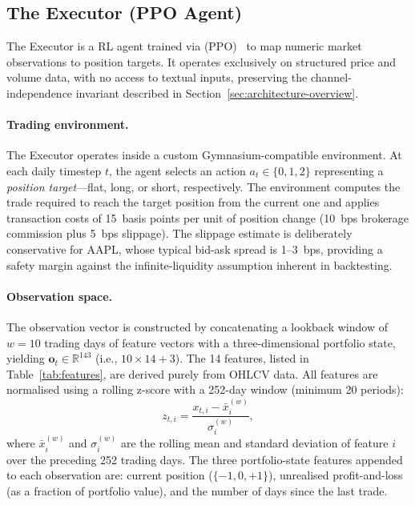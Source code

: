 \subsection{The Executor (PPO Agent)}
\label{sec:executor}

The Executor is a RL agent trained via (PPO)~\cite{schulman2017proximalpolicyoptimizationalgorithms}
to map numeric market observations to position targets. It operates
exclusively on structured price and volume data, with no access to textual
inputs, preserving the channel-independence invariant described in
Section~\ref{sec:architecture-overview}.

\paragraph{Trading environment.}
The Executor operates inside a custom Gymnasium-compatible environment. At
each daily timestep $t$, the agent selects an action
$a_t \in \{0, 1, 2\}$ representing a \emph{position target}---flat, long,
or short, respectively. The environment computes the trade required to reach
the target position from the current one and applies transaction costs of
15~basis points per unit of position change (10~bps brokerage commission plus
5~bps slippage). The slippage estimate is deliberately conservative for
AAPL, whose typical bid-ask spread is 1--3~bps, providing a safety margin
against the infinite-liquidity assumption inherent in backtesting.

\paragraph{Observation space.}
The observation vector is constructed by concatenating a lookback window of
$w = 10$ trading days of feature vectors with a three-dimensional portfolio
state, yielding $\mathbf{o}_t \in \mathbb{R}^{143}$ (i.e.,
$10 \times 14 + 3$). The 14 features, listed in
Table~\ref{tab:features}, are derived purely from OHLCV data.
All features are normalised using a rolling z-score with a 252-day window
(minimum 20 periods):
\begin{equation}
  z_{t,i} = \frac{x_{t,i} - \bar{x}_{i}^{(w)}}{\sigma_{i}^{(w)}},
\end{equation}
where $\bar{x}_{i}^{(w)}$ and $\sigma_{i}^{(w)}$ are the rolling mean and
standard deviation of feature $i$ over the preceding 252 trading days.
The three portfolio-state features appended to each observation are:
current position ($\{-1, 0, +1\}$), unrealised profit-and-loss (as a
fraction of portfolio value), and the number of days since the last trade.

